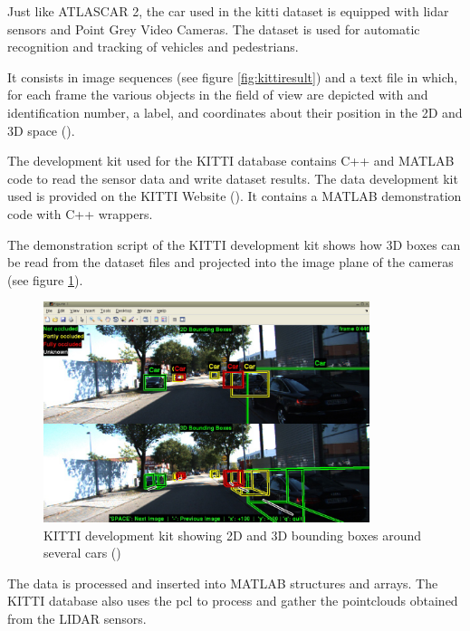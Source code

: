 Just like ATLASCAR 2, the car used in the \gls{kitti} dataset is equipped with \gls{lidar} sensors and Point Grey Video Cameras. The dataset is used for automatic recognition and tracking of vehicles and pedestrians. 

It consists in image sequences (see figure \ref{fig:kittiresult}) and a text file in which, for each frame the various objects in the field of view are depicted with and identification number, a label, and coordinates about their position in the 2D and 3D space (\cite{Geiger}). 

The development kit used for the KITTI database contains C++ and MATLAB code to read the sensor data and write dataset results. The data development kit used is provided on the KITTI Website (\cite{KarlsruheInstituteofTechnology}). It contains a MATLAB demonstration code with C++ wrappers. 

The demonstration script of the KITTI development kit shows how 3D boxes can be read from the dataset files and projected into the image plane of the cameras (see figure \ref{fig:kittidk}). 

\begin{figure}[!hb]
	
	\centering
	\includegraphics[width=0.85\textwidth]{capstate/imgs/kittidk.png}
	
	\caption{KITTI development kit showing 2D and 3D bounding boxes around several cars (\cite{KarlsruheInstituteofTechnology})}
	\label{fig:kittidk}
	
\end{figure}

The data is processed and inserted into MATLAB structures and arrays. The KITTI database also uses the \gls{pcl} to process and gather the pointclouds obtained from the LIDAR sensors.


